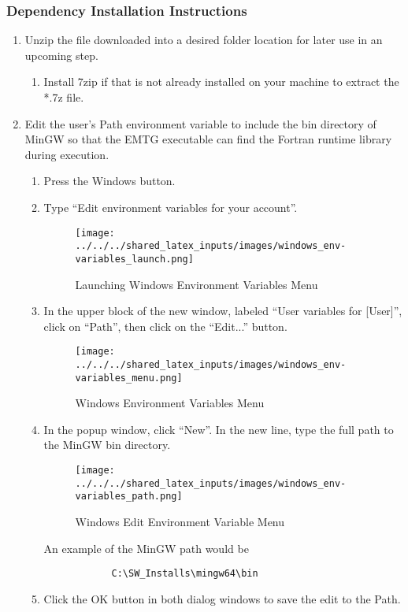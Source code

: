 \subsubsection{Dependency Installation Instructions}
\label{sec:mingw_installation_instructions}
\begin{enumerate}
	\item Unzip the file downloaded into a desired folder location for later use in an upcoming step. 
	\begin{enumerate}
		\item Install 7zip if that is not already installed on your machine to extract the *.7z file. 
	\end{enumerate}	
	\item Edit the user’s Path environment variable to include the bin directory of MinGW so that the EMTG executable can find the Fortran runtime library during execution.
	\begin{enumerate}
		\item Press the Windows button.
		\item Type “Edit environment variables for your account”. %
		\begin{figure}[H]
			\centering
			\texttt{[image: ../../../shared\_latex\_inputs/images/windows\_env-variables\_launch.png]}
			\caption{Launching Windows Environment Variables Menu}
		\end{figure}
		\item In the upper block of the new window, labeled “User variables for [User]”, click on “Path”, then click on the “Edit...” button. 
		\begin{figure}[H]
			\centering
			\texttt{[image: ../../../shared\_latex\_inputs/images/windows\_env-variables\_menu.png]}
			\caption{Windows Environment Variables Menu}
		\end{figure}
		\item In the popup window, click “New”. In the new line, type the full path to the MinGW bin directory. 
		\begin{figure}[H]
			\centering
			\texttt{[image: ../../../shared\_latex\_inputs/images/windows\_env-variables\_path.png]}
			\caption{Windows Edit Environment Variable Menu}
		\end{figure}
		An example of the MinGW path would be 
		\begin{verbatim}
			C:\SW_Installs\mingw64\bin
		\end{verbatim}
		\item Click the OK button in both dialog windows to save the edit to the Path.
	\end{enumerate}		
\end{enumerate}


